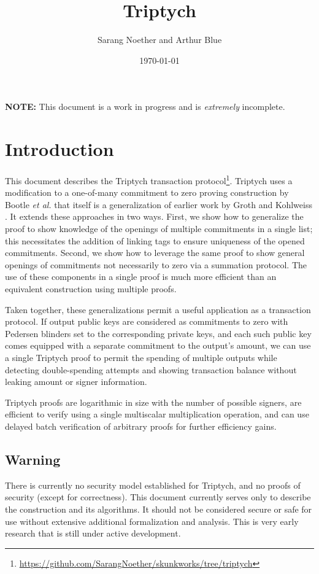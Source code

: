 \documentclass[draft]{article}
\title{Triptych}
\author{Sarang Noether and Arthur Blue}
\date{\today}
\begin{document}
\maketitle

\textbf{NOTE:} This document is a work in progress and is \textit{extremely} incomplete.


\section{Introduction}
This document describes the Triptych transaction protocol\footnote{\url{https://github.com/SarangNoether/skunkworks/tree/triptych}}. Triptych uses a modification to a one-of-many commitment to zero proving construction by Bootle \textit{et al.} \cite{bootle} that itself is a generalization of earlier work by Groth and Kohlweiss \cite{groth}. It extends these approaches in two ways. First, we show how to generalize the proof to show knowledge of the openings of multiple commitments in a single list; this necessitates the addition of linking tags to ensure uniqueness of the opened commitments. Second, we show how to leverage the same proof to show general openings of commitments not necessarily to zero via a summation protocol. The use of these components in a single proof is much more efficient than an equivalent construction using multiple proofs.

Taken together, these generalizations permit a useful application as a transaction protocol. If output public keys are considered as commitments to zero with Pedersen blinders set to the corresponding private keys, and each such public key comes equipped with a separate commitment to the output's amount, we can use a single Triptych proof to permit the spending of multiple outputs while detecting double-spending attempts and showing transaction balance without leaking amount or signer information.

Triptych proofs are logarithmic in size with the number of possible signers, are efficient to verify using a single multiscalar multiplication operation, and can use delayed batch verification of arbitrary proofs for further efficiency gains.

\subsection{Warning}
There is currently no security model established for Triptych, and no proofs of security (except for correctness). This document currently serves only to describe the construction and its algorithms. It should not be considered secure or safe for use without extensive additional formalization and analysis. This is very early research that is still under active development.
\end{document}
